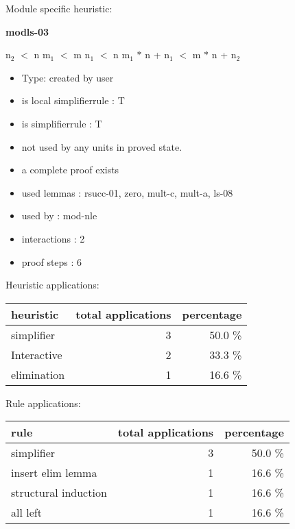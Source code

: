 \documentclass[a4paper]{article}
\begin{document}
Module specific heuristic:

\pagebreak

{\LARGE\bf modls-03}\label{lemma-modls-03}

\medskip

 \Fol $\mbox{n}_{2}$ $<$ n \And $\mbox{m}_{1}$ $<$ m \And $\mbox{n}_{1}$ $<$ n \Imp $\mbox{m}_{1}$ $*$ n + $\mbox{n}_{1}$ $<$ m $*$ n + $\mbox{n}_{2}$

\begin{itemize}

\item Type: created by user

\item is local simplifierrule : T
\item is simplifierrule : T
\item not used by any units in proved state.
\item       a complete proof exists
\item       used lemmas  : rsucc-01, zero, mult-c, mult-a, ls-08
\item       used by      : mod-nle
\item       interactions : 2
\item       proof steps  : 6
\end{itemize}

\medskip


Heuristic applications:

\begin{supertabular}{l|r|r}
heuristic	& total applications & percentage \\ \hline
simplifier & 3 & 50.0 \% \\
Interactive & 2 & 33.3 \% \\
elimination & 1 & 16.6 \% \\

\end{supertabular}

Rule applications:

\begin{supertabular}{l|r|r}
rule	        & total applications & percentage \\ \hline
simplifier & 3 & 50.0 \% \\
insert elim lemma & 1 & 16.6 \% \\
structural induction & 1 & 16.6 \% \\
all left & 1 & 16.6 \% \\

\end{supertabular}
\end{document}
